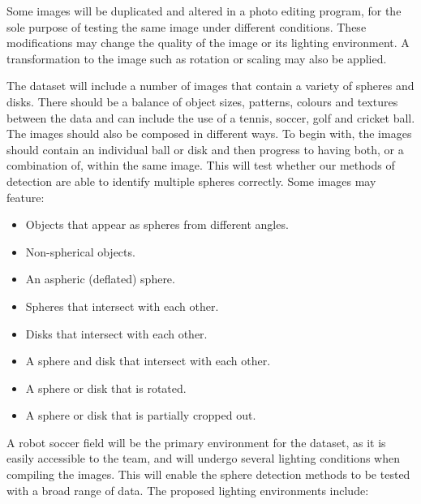 \documentclass[11pt]{scrartcl}
\begin{document}
{{        	Some images will be duplicated and altered in a photo editing program,
        	for the sole purpose of testing the same image under different 
        	conditions. These modifications may change the quality of the image or
        	its lighting environment. A transformation to the image such as rotation
        	or scaling may also be applied.

        	The dataset will include a number of images that contain a variety of
        	spheres and disks. There should be a balance of object sizes, patterns,
        	colours and textures between the data and can include the use of a
        	tennis, soccer, golf and cricket ball. The images should also be
        	composed in different ways. To begin with, the images should contain an
        	individual ball or disk and then progress to having both, or a 
        	combination of, within the same image. This will test whether our
        	methods of detection are able to identify multiple spheres correctly.
			Some images may feature:

        	\begin{itemize}
        		\item Objects that appear as spheres from different angles.
        		\item Non-spherical objects.
        		\item An aspheric (deflated) sphere.
        		\item Spheres that intersect with each other.
        		\item Disks that intersect with each other.
        		\item A sphere and disk that intersect with each other.
        		\item A sphere or disk that is rotated.
        		\item A sphere or disk that is partially cropped out.
        	\end{itemize}

        	A robot soccer field will be the primary environment for the dataset, as
        	it is easily accessible to the team, and will undergo several lighting
        	conditions when compiling the images. This will enable the sphere 
        	detection methods to be tested with a broad range of data. The proposed
        	lighting environments include:

}}
\end{document}
